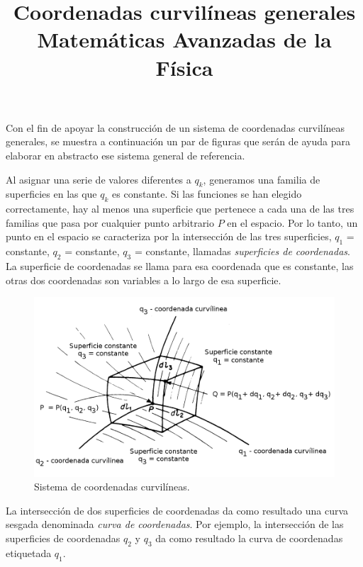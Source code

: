 
\marginsize{1.5cm}{1.5cm}{2cm}{2cm} 
\title{Coordenadas curvilíneas generales \\ {\large Matemáticas Avanzadas de la Física}}
\date{ }

\renewcommand\labelenumii{\theenumi.{\arabic{enumii}}}
\maketitle
\fontsize{14}{14}\selectfont
\vspace{-2cm}
Con el fin de apoyar la construcción de un sistema de coordenadas curvilíneas generales, se muestra a continuación un par de figuras que serán de ayuda para elaborar en abstracto ese sistema general de referencia.
\par
Al asignar una serie de valores diferentes a $q_{k}$, generamos una familia de superficies en las que $q_{k}$ es constante. Si las funciones se han elegido correctamente, hay al menos una superficie que pertenece a cada una de las tres familias que pasa por cualquier punto arbitrario $P$ en el espacio. Por lo tanto, un punto en el espacio se caracteriza por la intersección de las tres superficies, $q_{1}$ = constante, $q_{2}$ = constante, $q_{3}$ = constante, llamadas \emph{superficies de coordenadas}. La superficie de coordenadas se llama para esa coordenada que es constante, las otras dos coordenadas son variables a lo largo de esa superficie.
\begin{figure}[H]
    \centering
    \includegraphics[scale=0.35]{Imagenes/CoordenadasCurvilineas_01.png}
    \caption{Sistema de coordenadas curvilíneas.}
\end{figure}
La intersección de dos superficies de coordenadas da como resultado una curva sesgada denominada \emph{curva de coordenadas}. Por ejemplo, la intersección de las superficies de coordenadas $q_{2}$ y $q_{3}$ da como resultado la curva de coordenadas etiquetada $q_{1}$.
